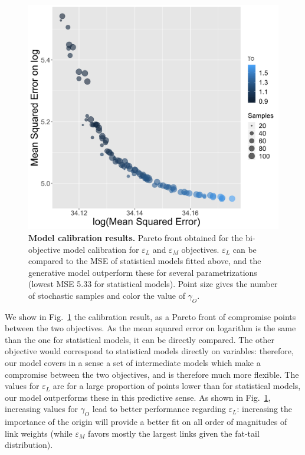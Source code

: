 \documentclass[10pt,letterpaper]{article}
\begin{document}
\begin{figure}
	\begin{center}
    \includegraphics[width=0.75\linewidth]{figures/Fig8.png}
    \end{center}
    \vspace{2cm}
	\caption{\textbf{Model calibration results.} Pareto front obtained for the bi-objective model calibration for $\varepsilon_L$ and $\varepsilon_M$ objectives. $\varepsilon_L$ can be compared to the MSE of statistical models fitted above, and the generative model outperform these for several parametrizations (lowest MSE 5.33 for statistical models). Point size gives the number of stochastic samples and color the value of $\gamma_O$.\label{fig:fig8}}
\end{figure}


We show in Fig.~\ref{fig:fig8} the calibration result, as a Pareto front of compromise points between the two objectives. As the mean squared error on logarithm is the same than the one for statistical models, it can be directly compared. The other objective would correspond to statistical models directly on variables: therefore, our model covers in a sense a set of intermediate models which make a compromise between the two objectives, and is therefore much more flexible. The values for $\varepsilon_L$ are for a large proportion of points lower than for statistical models, our model outperforms these in this predictive sense. As shown in Fig.~\ref{fig:fig8}, increasing values for $\gamma_O$ lead to better performance regarding $\varepsilon_L$: increasing the importance of the origin will provide a better fit on all order of magnitudes of link weights (while $\varepsilon_M$ favors mostly the largest links given the fat-tail distribution).
\end{document}
